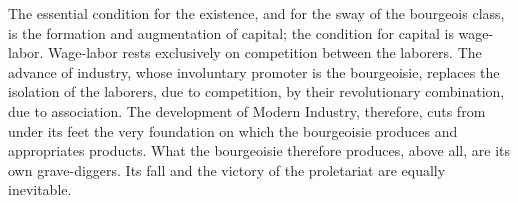 The essential condition for the existence, and for the sway of the bourgeois class, is the formation and augmentation of capital; the condition for capital is wage-labor. Wage-labor rests exclusively on competition between the laborers. The advance of industry, whose involuntary promoter is the bourgeoisie, replaces the isolation of the laborers, due to competition, by their revolutionary combination, due to association. The development of Modern Industry, therefore, cuts from under its feet the very foundation on which the bourgeoisie produces and appropriates products. What the bourgeoisie therefore produces, above all, are its own grave-diggers. Its fall and the victory of the proletariat are equally inevitable.